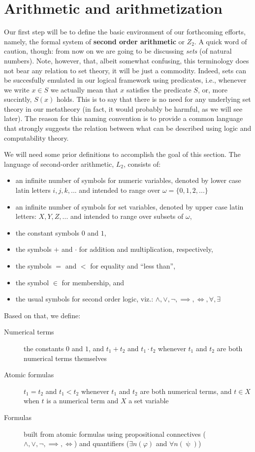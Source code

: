 \documentclass[../main.tex]{memoir}
\begin{document}
\chapter{Arithmetic and arithmetization}

Our first step will be to define the basic environment of our forthcoming efforts, namely, the formal system of \textbf{second order arithmetic} or $Z_2$. A quick word of caution, though: from now on we are going to be discussing \textit{sets} (of natural numbers). Note, however, that, albeit somewhat confusing, this terminology does not bear any relation to set theory, it will be just a commodity. Indeed, sets can be succesfully emulated in our logical framework using predicates, i.e., whenever we write $x \in S$ we actually mean that $x$ satisfies the predicate $S$, or, more succintly, $S(x)$ holds. This is to say that there is no need for any underlying set theory in our metatheory (in fact, it would probably be harmful, as we will see later). The reason for this naming convention is to provide a common language that strongly suggests the relation between what can be described using logic and computability theory.

We will need some prior definitions to accomplish the goal of this section. The language of second-order arithmetic, $L_2$, consists of:

\begin{itemize}
    \item an infinite number of symbols for numeric variables, denoted by lower case latin letters $i, j, k, ...$ and intended to range over $\omega = \{0, 1, 2, ...\}$
    \item an infinite number of symbols for set variables, denoted by upper case latin letters: $X, Y, Z, ...$ and intended to range over subsets of $\omega$,
    \item the constant symbols $0$ and $1$,
    \item the symbols $+$ and $\cdot$ for addition and multiplication, respectively,
    \item the symbols $=$ and $<$ for equality and ``less than'',
    \item the symbol $\in$ for membership, and
    \item the usual symbols for second order logic, viz.: $\land, \lor, \neg, \implies, \iff, \forall, \exists$
\end{itemize}

Based on that, we define:

\begin{description}
    \item[Numerical terms] the constants $0$ and $1$, and $t_1 + t_2$ and $t_1 \cdot t_2$ whenever $t_1$ and $t_2$ are both numerical terms themselves
    \item[Atomic formulas] $t_1 = t_2$ and $t_1 < t_2$ whenever $t_1$ and $t_2$ are both numerical terms, and $t \in X$ when $t$ is a numerical term and $X$ a set variable
    \item[Formulas] built from atomic formulas using propositional connectives ($\land, \lor, \neg, \implies, \iff$) and quantifiers ($\exists n (\varphi)$ and $\forall n (\uppsi)$)
\end{description}
\end{document}

